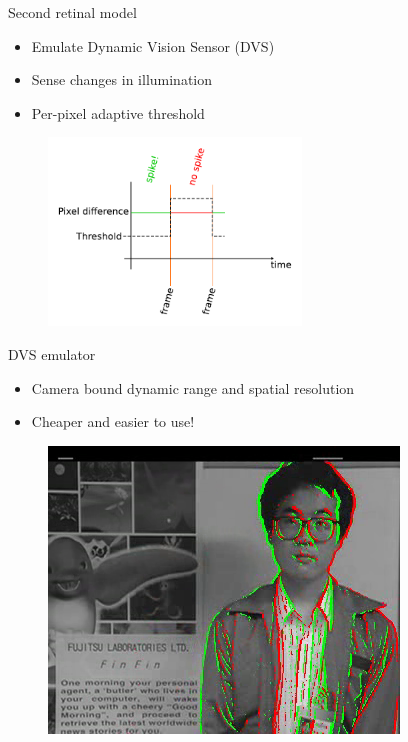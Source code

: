 \documentclass[17pt,mathserif]{beamer}
\begin{document}
    \begin{frame}{Second retinal model}
      \vspace*{-2em}
      \begin{itemize}
        \item Emulate Dynamic Vision Sensor (DVS)
        \item Sense changes in illumination
        \item Per-pixel adaptive threshold
      \end{itemize}
      \vspace*{-1em}
      \begin{figure}
        \includegraphics[width=0.6\textwidth]{DVSemu}
      \end{figure}
    \end{frame}

    \begin{frame}{DVS emulator}
      \vspace*{-2em}
      \hspace*{-2em}
      \begin{minipage}{0.66\textwidth}
        \begin{itemize}
          \item Camera bound dynamic range and spatial resolution
          \item Cheaper and easier to use!
        \end{itemize}
      \end{minipage}
      \begin{minipage}{0.33\textwidth}
        \vspace*{-1em}
        \begin{figure}
          \hspace*{0.1em}
          \includegraphics[scale=0.38]{dvs-emu-img}
        \end{figure}
      \end{minipage}
    \end{frame}
\end{document}
